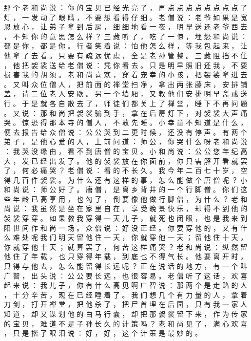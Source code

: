 {那 个 老 和 尚 说 ： 你 的 宝 贝 已 经 光 亮 了 ， 再 点 点 点 点 点 点 点 点 了 灯 ， 一 发 动 了 眼 睛 ， 不 要 想 看 得 仔 细 。
老 僧 说 ： 老 爷 如 果 是 宽 恩 放 心 ， 让 弟 子 拿 到 后 房 ， 细 细 地 看 一 夜 ， 明 早 送 还 老 爷 西 去 ， 不 知 你 的 意 思 怎 么 样 ？ 三 藏 听 了 ， 吃 了 一 惊 ， 埋 怨 和 尚 说 ： 都 是 你 ， 都 是 你 。
行 者 笑 着 说 ： 怕 他 怎 么 样 ， 等 我 包 起 来 ， 让 他 拿 了 去 看 。
只 要 有 疏 远 忧 虑 ， 全 是 老 孙 管 整 。
三 藏 阻 挡 不 住 ， 他 把 袈 裟 送 给 老 僧 说 ： 凭 你 看 去 。
只 是 明 早 照 旧 还 我 ， 不 要 损 害 我 的 胡 须 。
老 和 尚 喜 欢 ， 穿 着 宠 幸 的 小 孩 ， 把 袈 裟 拿 进 去 。
又 叫 众 位 僧 人 ， 把 前 面 的 禅 堂 扫 净 ， 拿 出 两 张 藤 床 ， 安 排 铺 盖 ， 请 二 位 老 人 安 歇 。 另 一 个 墙 厢 ， 又 教 他 们 安 排 明 早 斋 戒 送 行 。
于 是 就 各 自 散 去 了 ， 师 徒 们 都 关 上 了 禅 堂 ， 睡 下 不 再 问 题 。
又 说 ： 那 和 尚 把 袈 裟 骗 到 手 ， 拿 在 后 房 灯 下 ， 对 袈 裟 大 声 痛 哭 。
惊 恐 得 那 本 寺 的 僧 人 ， 不 敢 先 睡 。
小 幸 童 不 知 道 是 什 么 ， 便 去 报 告 给 众 僧 说 ： 公 公 哭 到 二 更 时 候 ， 还 没 有 停 声 。
有 两 个 弟 子 ， 是 他 心 爱 的 人 ， 上 前 问 道 ： 师 公 ， 你 哭 什 么 呀 老 和 尚 说 ： 我 哭 没 缘 由 ， 看 不 到 唐 僧 的 宝 贝 。
小 和 尚 说 ： 公 公 您 年 纪 高 大 ， 发 已 经 出 发 了 。
他 的 袈 裟 放 在 你 面 前 ， 你 只 需 解 开 看 就 罢 了 ， 何 必 痛 哭 ？ 老 僧 说 ： 看 的 不 长 久 。
我 今 年 二 百 七 十 岁 ， 空 得 几 百 件 袈 裟 。
为 什 么 还 有 这 样 的 事 ， 怎 么 能 做 个 唐 僧 呢 ？ 小 和 尚 说 ： 师 公 好 了 。
唐 僧 ， 是 离 乡 背 井 的 一 个 行 脚 僧 。
你 们 这 些 年 龄 已 高 享 用 ， 也 勾 了 ， 倒 要 像 他 做 行 脚 僧 ， 为 什 么 ？ 老 和 尚 说 ： 我 虽 然 是 坐 在 家 里 自 在 ， 享 受 晚 景 快 乐 ， 却 得 不 到 他 的 袈 裟 穿 穿 。
如 果 教 我 穿 得 一 天 儿 子 ， 就 死 也 闭 眼 ， 也 是 我 来 到 阳 世 间 作 和 尚 一 场 。
众 僧 说 ： 好 没 正 经 。
你 要 穿 他 的 ， 又 有 什 么 难 处 呢 我 们 明 天 留 他 住 一 天 ， 你 就 穿 他 一 天 ； 留 他 住 十 天 ， 你 就 穿 他 十 天 ； 就 算 罢 了 ， 何 苦 这 样 痛 哭 ？ 老 和 尚 说 ： 纵 然 留 他 住 了 年 载 ， 也 只 穿 得 年 载 ， 到 底 也 不 得 气 长 。
他 要 离 开 时 ， 只 得 与 他 去 ， 怎 么 能 留 得 长 远 呢 ？ 正 在 说 话 的 地 方 ， 有 一 个 叫 广 智 ， 出 头 说 ： 公 公 要 长 远 ， 也 很 容 易 。
老 僧 听 了 这 话 ， 欢 喜 起 来 说 ： 我 儿 子 ， 你 有 什 么 高 见 啊 广 智 说 ： 那 两 个 是 走 路 的 人 ， 十 分 辛 苦 ， 现 在 已 经 睡 着 了 。
我 们 想 几 个 有 力 量 的 人 ， 拿 着 刀 剑 ， 打 开 禅 堂 ， 把 他 杀 了 ， 把 尸 首 埋 在 后 园 ， 只 有 我 一 家 人 知 道 ， 却 又 谋 划 他 的 白 马 行 囊 ， 却 把 那 袈 裟 留 下 来 ， 作 为 传 家 的 宝 贝 ， 难 道 不 是 子 孙 长 久 的 计 策 吗 ？ 老 和 尚 见 了 ， 满 心 欢 喜 ， 只 是 揩 了 眼 泪 说 ： 好 ， 好 ， 这 个 计 策 是 最 妙 的 。
}
